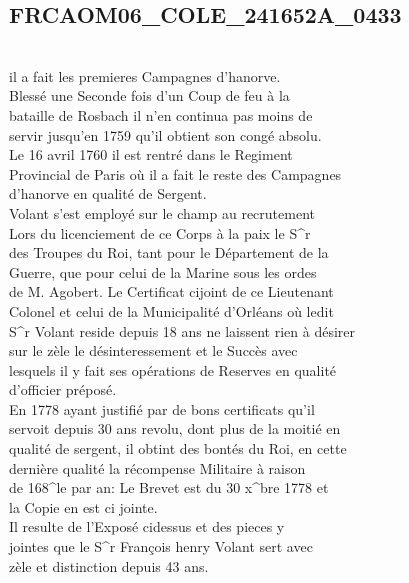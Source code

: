 \documentclass{article}
\begin{document}
\begin{pages}
\pend
\endnumbering\beginnumbering\section{FRCAOM06\_COLE\_241652A\_0433}\pstart
\\
il a fait les premieres Campagnes d'hanorve.\\
Blessé une Seconde fois d'un Coup de feu à la\\
bataille de Rosbach il n'en continua pas moins de\\
servir jusqu'en 1759 qu'il obtient son congé absolu.\\
Le 16 avril 1760 il est rentré dans le Regiment\\
Provincial de Paris où il a fait le reste des Campagnes\\
d'hanorve en qualité de Sergent.\\
Volant s'est employé sur le champ au recrutement\\
Lors du licenciement de ce Corps à la paix le S\^{}r\\
des Troupes du Roi, tant pour le Département de la\\
Guerre, que pour celui de la Marine sous les ordes\\
de M. Agobert. Le Certificat cijoint de ce Lieutenant\\
Colonel et celui de la Municipalité d'Orléans où ledit\\
S\^{}r Volant reside depuis 18 ans ne laissent rien à désirer\\
sur le zèle le désinteressement et le Succès avec\\
lesquels il y fait ses opérations de Reserves en qualité\\
d'officier préposé.\\
En 1778 ayant justifié par de bons certificats qu'il\\
servoit depuis 30 ans revolu, dont plus de la moitié en\\
qualité de sergent, il obtint des bontés du Roi, en cette\\
dernière qualité la récompense Militaire à raison\\
de 168\^{}le par an: Le Brevet est du 30 x\^{}bre 1778 et\\
la Copie en est ci jointe.\\
Il resulte de l'Exposé cidessus et des pieces y\\
jointes que le S\^{}r François henry Volant sert avec\\
zèle et distinction depuis 43 ans.\\

\end{pages}
\end{document}
